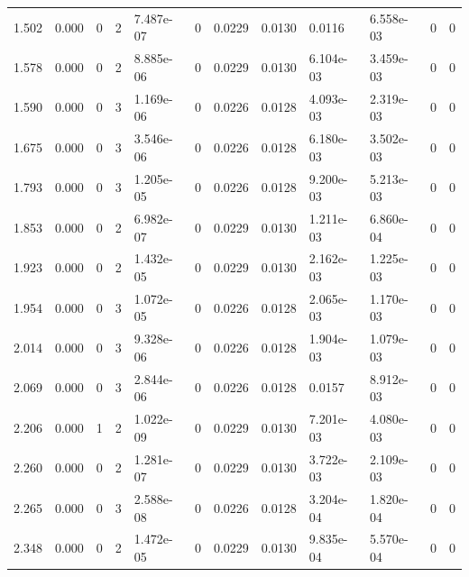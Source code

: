 \documentclass[preview]{standalone}
\begin{document}
{{\begin{tabular}{L{1.2cm}C{1.2cm} C{0.3cm}C{0.5cm} C{1.4cm}C{1.4cm} C{1.4cm}C{1.4cm} C{1.6cm}C{1.6cm} C{1.6cm}C{1.6cm}}
  1.502  &  0.000  & 0     &  2 &  7.487e-07  & 0  &  0.0229&   0.0130& 0.0116 & 6.558e-03   &  0 & 0  \\ 
  1.578  &  0.000  & 0     &  2 &  8.885e-06  & 0  &  0.0229&   0.0130& 6.104e-03 & 3.459e-03   &  0 & 0  \\ 
  1.590  &  0.000  & 0     &  3 &  1.169e-06  & 0  &  0.0226&   0.0128& 4.093e-03 & 2.319e-03   &  0 & 0  \\ 
  1.675  &  0.000  & 0     &  3 &  3.546e-06  & 0  &  0.0226&   0.0128& 6.180e-03 & 3.502e-03   &  0 & 0  \\ 
  1.793  &  0.000  & 0     &  3 &  1.205e-05  & 0  &  0.0226&   0.0128& 9.200e-03 & 5.213e-03   &  0 & 0  \\ 
  1.853  &  0.000  & 0     &  2 &  6.982e-07  & 0  &  0.0229&   0.0130& 1.211e-03 & 6.860e-04   &  0 & 0  \\ 
  1.923  &  0.000  & 0     &  2 &  1.432e-05  & 0  &  0.0229&   0.0130& 2.162e-03 & 1.225e-03   &  0 & 0  \\ 
  1.954  &  0.000  & 0     &  3 &  1.072e-05  & 0  &  0.0226&   0.0128& 2.065e-03 & 1.170e-03   &  0 & 0  \\ 
  2.014  &  0.000  & 0     &  3 &  9.328e-06  & 0  &  0.0226&   0.0128& 1.904e-03 & 1.079e-03   &  0 & 0  \\ 
  2.069  &  0.000  & 0     &  3 &  2.844e-06  & 0  &  0.0226&   0.0128& 0.0157 & 8.912e-03   &  0 & 0  \\ 
  2.206  &  0.000  & 1     &  2 &  1.022e-09  & 0  &  0.0229&   0.0130& 7.201e-03 & 4.080e-03   &  0 & 0  \\ 
  2.260  &  0.000  & 0     &  2 &  1.281e-07  & 0  &  0.0229&   0.0130& 3.722e-03 & 2.109e-03   &  0 & 0  \\ 
  2.265  &  0.000  & 0     &  3 &  2.588e-08  & 0  &  0.0226&   0.0128& 3.204e-04 & 1.820e-04   &  0 & 0  \\ 
  2.348  &  0.000  & 0     &  2 &  1.472e-05  & 0  &  0.0229&   0.0130& 9.835e-04 & 5.570e-04   &  0 & 0  \\ 
\hline 
\end{tabular} 

}}
\end{document}
